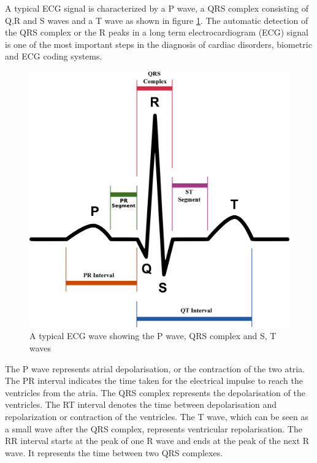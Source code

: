 \documentclass[11pt]{article}
\theoremstyle{definition}
\begin{document}
  A typical ECG signal is characterized by a P wave, a QRS complex consisting of Q,R and S waves and a T wave as shown in figure \ref{fig:pqrst}.
  The automatic detection of the QRS complex or the R peaks in a long term electrocardiogram (ECG) signal is one of the most important steps in the diagnosis of cardiac disorders, biometric and ECG coding systems.

  \begin{figure}[h]
    \centering
    \includegraphics[scale=0.2]{images/SinusRhythmLabels.jpg}
    \caption{A typical ECG wave showing the P wave, QRS complex and S, T waves\cite{wiki:SinusRythmLabels}}
    \label{fig:pqrst}
  \end{figure}

  The P wave represents atrial depolarisation, or the contraction of the two atria.
  The PR interval indicates the time taken for the electrical impulse to reach the ventricles from the atria.
  The QRS complex represents the depolarisation of the ventricles.
  The RT interval denotes the time between depolarisation and repolarization or contraction of the ventricles.
  The T wave, which can be seen as a small wave after the QRS complex, represents ventricular repolarisation.
  The RR interval starts at the peak of one R wave and ends at the peak of the next R wave. It represents the time between two QRS complexes.
\end{document}
